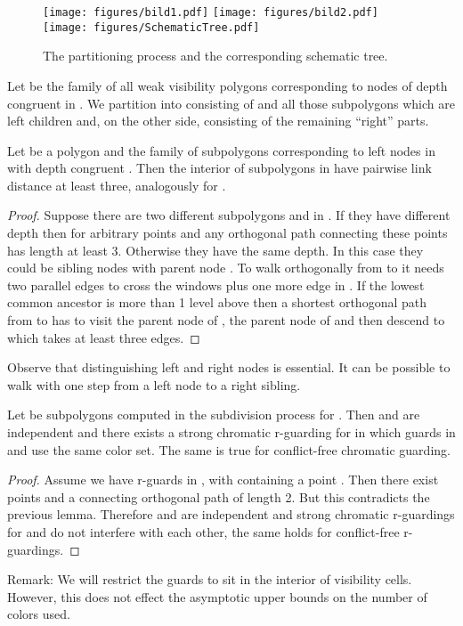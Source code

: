 \documentclass[a4paper,USenglish,numberwithinsect]{lipics}
\theoremstyle{plain}
\begin{document}
\begin{figure}
\centering
\texttt{[image: figures/bild1.pdf]}\quad\quad
\texttt{[image: figures/bild2.pdf]}\quad\quad
\texttt{[image: figures/SchematicTree.pdf]}
\caption{The partitioning process and the corresponding schematic tree.}
\label{partitionFigures}
\end{figure}
Let  be the family of all weak visibility polygons
corresponding to nodes of depth congruent  in . We
partition   into  consisting of  and all those
subpolygons which are left
 children and, on the other side,   consisting of the remaining ``right'' parts.

\begin{lemma}
\label{indep}
Let  be a polygon and   the family of subpolygons corresponding to  left nodes in
 with depth congruent . Then the interior of  subpolygons in 
 have  pairwise link distance at least three, analogously for .
\end{lemma}
\begin{proof}
Suppose there are two different  subpolygons  and  in 
. If  they have different depth then for arbitrary points
 and  any orthogonal path connecting
these points has
length
 at least 3. Otherwise they have the same depth. In this  case they
could be sibling nodes with parent node . To walk orthogonally 
from  to  it needs  two parallel edges to cross the windows
plus one more edge in
 . If the lowest common ancestor  is more than 1 level above
then a shortest orthogonal path from  to  has to visit the
parent node of , the parent node of  and then descend to 
which takes at least three edges.
\end{proof}

Observe that distinguishing left and right nodes is essential. It can be
possible to walk with one step from a left node to a right sibling.

\begin{corollary} Let  be subpolygons computed in the subdivision process for .
Then  and  are independent and there exists a strong chromatic r-guarding for  in which guards in  and  use the same
color set. The same is true for conflict-free chromatic guarding.
\end{corollary}

\begin{proof} 
Assume we have  r-guards  in  ,  with  containing a point . Then there exist points  and a
connecting orthogonal path
 of length 2. But  this contradicts the previous lemma.
Therefore   and  are independent and strong chromatic r-guardings for  and  do
not interfere with each other,
the same holds for conflict-free r-guardings.
\end{proof}
Remark: We will restrict the guards to sit in the interior of visibility cells. However, this does not effect the asymptotic upper bounds on the number of colors used.
\end{document}

